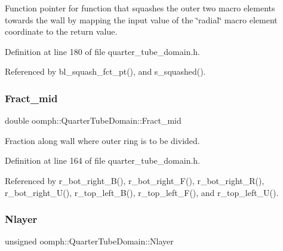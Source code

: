 Function pointer for function that squashes the outer two macro elements towards the wall by mapping the input value of the \char`\"{}radial\char`\"{} macro element coordinate to the return value. 



Definition at line 180 of file quarter\+\_\+tube\+\_\+domain.\+h.



Referenced by bl\+\_\+squash\+\_\+fct\+\_\+pt(), and s\+\_\+squashed().

\mbox{\label{classoomph_1_1QuarterTubeDomain_aed92f9d08bf052a1575d4de159adfb7a}} 
\subsubsection{\texorpdfstring{Fract\+\_\+mid}{Fract\_mid}}
{\footnotesize\ttfamily double oomph\+::\+Quarter\+Tube\+Domain\+::\+Fract\+\_\+mid\hspace{0.3cm}{\ttfamily [private]}}



Fraction along wall where outer ring is to be divided. 



Definition at line 164 of file quarter\+\_\+tube\+\_\+domain.\+h.



Referenced by r\+\_\+bot\+\_\+right\+\_\+\+B(), r\+\_\+bot\+\_\+right\+\_\+\+F(), r\+\_\+bot\+\_\+right\+\_\+\+R(), r\+\_\+bot\+\_\+right\+\_\+\+U(), r\+\_\+top\+\_\+left\+\_\+\+B(), r\+\_\+top\+\_\+left\+\_\+\+F(), and r\+\_\+top\+\_\+left\+\_\+\+U().

\mbox{\label{classoomph_1_1QuarterTubeDomain_a64d806aba766a439eb6ea49798c50b13}} 
\subsubsection{\texorpdfstring{Nlayer}{Nlayer}}
{\footnotesize\ttfamily unsigned oomph\+::\+Quarter\+Tube\+Domain\+::\+Nlayer\hspace{0.3cm}{\ttfamily [private]}}



